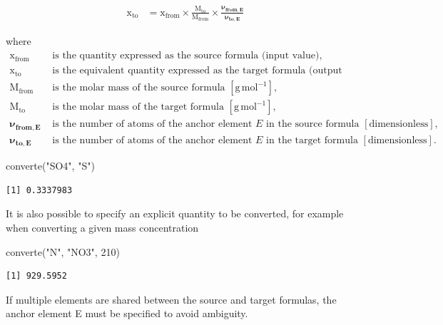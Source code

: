 \documentclass[
  letterpaper,
  DIV=11,
  numbers=noendperiod]{scrreprt}
\newenvironment{Shaded}{\begin{snugshade}}{\end{snugshade}}
\newcommand{\DecValTok}[1]{\textcolor[rgb]{0.68,0.00,0.00}{#1}}
\newcommand{\FunctionTok}[1]{\textcolor[rgb]{0.28,0.35,0.67}{#1}}
\newcommand{\NormalTok}[1]{\textcolor[rgb]{0.00,0.23,0.31}{#1}}
\newcommand{\StringTok}[1]{\textcolor[rgb]{0.13,0.47,0.30}{#1}}
\begin{document}
\begin{align*}
\mathrm{x_{to}} &= \mathrm{x_{from}} \times
\frac{\mathrm{M_{to}}}{\mathrm{M_{from}}} \times
\frac{\boldsymbol{\nu_{from,E}}}{\boldsymbol{\nu_{to,E}}}
\end{align*}

\noindent
where
\begin{align*}
\mathrm{x_{from}} &\text{ is the quantity expressed as the source formula (input value),} \\
\mathrm{x_{to}}   &\text{ is the equivalent quantity expressed as the target formula (output value),} \\
\mathrm{M_{from}} &\text{ is the molar mass of the source formula } [\mathrm{g\,mol^{-1}}], \\
\mathrm{M_{to}}   &\text{ is the molar mass of the target formula } [\mathrm{g\,mol^{-1}}], \\
\boldsymbol{\nu_{from,E}} &\text{ is the number of atoms of the anchor element } E \text{ in the source formula } [\text{dimensionless}], \\
\boldsymbol{\nu_{to,E}}   &\text{ is the number of atoms of the anchor element } E \text{ in the target formula } [\text{dimensionless}].
\end{align*}

\begin{Shaded}
\begin{Highlighting}[]
\FunctionTok{converte}\NormalTok{(}\StringTok{"SO4"}\NormalTok{, }\StringTok{"S"}\NormalTok{)}
\end{Highlighting}
\end{Shaded}

\begin{verbatim}
[1] 0.3337983
\end{verbatim}

It is also possible to specify an explicit quantity to be converted, for
example when converting a given mass concentration

\begin{Shaded}
\begin{Highlighting}[]
\FunctionTok{converte}\NormalTok{(}\StringTok{"N"}\NormalTok{, }\StringTok{"NO3"}\NormalTok{, }\DecValTok{210}\NormalTok{)}
\end{Highlighting}
\end{Shaded}

\begin{verbatim}
[1] 929.5952
\end{verbatim}

If multiple elements are shared between the source and target formulas,
the anchor element E must be specified to avoid ambiguity.
\end{document}
